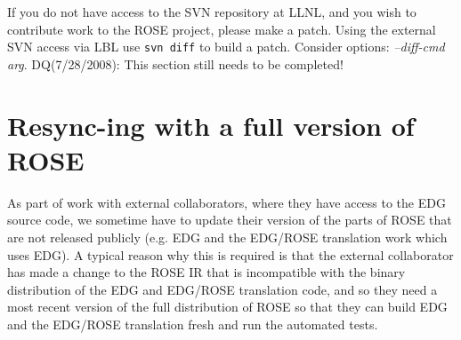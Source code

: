 \begin{enumerate}

    \end{enumerate}

  If you do not have access to the SVN repository at LLNL, and you wish to contribute
    work to the ROSE project, please make a patch.  Using the external SVN access via
    LBL use {\tt svn diff} to build a patch.
    Consider options: {\em --diff-cmd arg}.
    DQ(7/28/2008): This section still needs to be completed!




\section{Resync-ing with a full version of ROSE}%
   As part of work with external collaborators, where they have 
access to the EDG source code, we sometime have to update their
version of the parts of ROSE that are not released publicly
(e.g. EDG and the EDG/ROSE translation work which uses EDG).
A typical reason why this is required is that the external
collaborator has made a change to the ROSE IR that is incompatible
with the binary distribution of the EDG and EDG/ROSE translation code,
and so they need a most recent version of the full distribution of
ROSE so that they can build EDG and the EDG/ROSE translation fresh
and run the automated tests.

